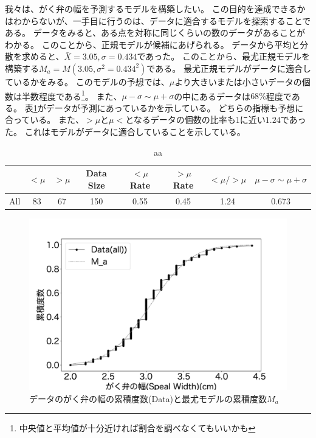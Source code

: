 我々は、がく弁の幅を予測するモデルを構築したい。
この目的を達成できるかはわからないが、一手目に行うのは、データに適合するモデルを探索することである。
データをみると、ある点を対称に同じくらいの数のデータがあることがわかる。
このことから、正規モデルが候補にあげられる。
データから平均と分散を求めると、$\bar{X}=3.05,\sigma=0.434$であった。
このことから、最尤正規モデルを構築する$M_a=M(3.05,\sigma^2=0.434^2)$である。
最尤正規モデルがデータに適合しているかをみる。
このモデルの予想では、$\mu$より大きいまたは小さいデータの個数は半数程度である\footnote{中央値と平均値が十分近ければ割合を調べなくてもいいかも}。
また、$\mu-\sigma \sim \mu+\sigma$の中にあるデータは$68\%$程度である。
表\ref{table:all_spael_width_table}がデータが予測にあっているかを示している。
どちらの指標も予想に合っている。
また、$>\mu$と$\mu<$となるデータの個数の比率も$1$に近い$1.24$であった。
これはモデルがデータに適合していることを示している。
\begin{table}[h]
    \caption{aa}
    \label{table:all_spael_width_table}
    \centering
    \begin{tabular}{lccccccc}
        \hline
        {} &  $<\mu$ &  $>\mu$ &  Data Size &  $<\mu$ Rate &  $>\mu$ Rate &  $<\mu/>\mu$ & $\mu-\sigma\sim\mu+\sigma$\\
        \hline
        All    &    83 &    67 &        150 &       0.55 &       0.45 &       1.24 & 0.673\\
        \hline
    \end{tabular}
\end{table}

\begin{figure}
    \begin{center}
        \includegraphics[width=15cm]{./image/15_/speal_width_all.pdf}
        \caption{データのがく弁の幅の累積度数(Data)と最尤モデルの累積度数$M_a$}
        \label{fig:all_speal_width_fig}
    \end{center}
\end{figure}

